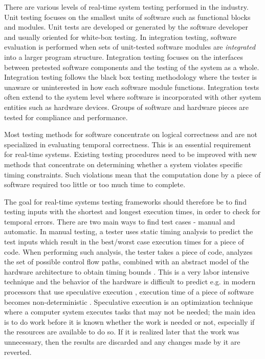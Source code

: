 There are various levels of real-time system testing performed in the industry. Unit testing focuses on the smallest units of software such as functional blocks and modules. Unit tests are developed or generated by the software developer and usually oriented for white-box testing. In integration testing, software evaluation is performed when sets of unit-tested software modules are \emph{integrated} into a larger program structure. Integration testing focuses on the interfaces between pretested software components and the testing of the system as a whole. Integration testing follows the black box testing methodology where the tester is unaware or uninterested in how each software module functions. Integration tests often extend to the system level where software is incorporated with other system entities such as hardware devices. Groups of software and hardware pieces are tested for compliance and performance. 

Most testing methods for software concentrate on logical correctness and are not specialized in evaluating temporal correctness. This is an essential requirement for real-time systems. Existing testing procedures need to be improved with new methods that concentrate on determining whether a system violates specific timing constraints. Such violations mean that the computation done by a piece of software required too little or too much time to complete. 

The goal for real-time systems testing frameworks should therefore be to find testing inputs with the shortest and longest execution times, in order to check for temporal errors. There are two main ways to find test cases - manual and automatic. In manual testing, a tester uses static timing analysis to predict the test inputs which result in the best/worst case execution times for a piece of code. When performing such analysis, the tester takes a piece of code, analyzes the set of possible control flow paths, combined with an abstract model of the hardware architecture to obtain timing bounds \cite{reviewWCET}. This is a very labor intensive technique and the behavior of the hardware is difficult to predict e.g. in modern processors that use speculative execution \cite{hennessy2011computer}, execution time of a piece of software becomes non-deterministic \cite{reineke2006definition}. Speculative execution is an optimization technique where a computer system executes tasks that may not be needed; the main idea is to do work before it is known whether the work is needed or not, especially if the resources are available to do so. If it is realized later that the work was unnecessary, then the results are discarded and any changes made by it are reverted. 

